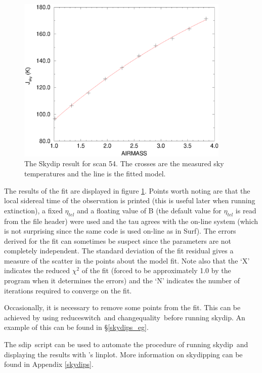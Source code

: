 \documentclass[twoside,11pt]{article}
\newcommand{\scusoft}          {{\sc Surf}}
\newcommand{\Kappa}{\xref{{\sc{Kappa}}}{sun95}{}}
\newcommand{\task}[1]{{\sf #1}}
\newcommand{\chgqual}{\htmlref{\task{change\_quality}}{CHANGE_QUALITY}}
\newcommand{\resw}{\htmlref{\task{reduce\_switch}}{REDUCE_SWITCH}}
\newcommand{\skydip}{\htmlref{\task{skydip}}{SKYDIP}}
\newcommand{\ext}{\htmlref{\task{extinction}}{EXTINCTION}}
\newcommand{\sdip}{\htmlref{\task{sdip}}{SDIP}}
\newcommand{\linplot}{\xref{\task{linplot}}{sun95}{LINPLOT}}
\newcommand{\htmlref}[2]{#1}
\newcommand{\xref}[3]{#1}
\renewcommand{\_}{\texttt{\symbol{95}}}
\begin{document}
\begin{figure}
\begin{center}
\includegraphics[width=4in]{sun216_skydip.eps}
\caption{The Skydip result for scan 54. The crosses are the measured
sky temperatures and the line is the fitted model.}
\label{skyfig}
\end{center}
\end{figure}


The results of the fit are displayed in figure \ref{skyfig}. Points worth
noting are that the local sidereal time of the observation is printed (this is
useful later when running \ext), a fixed $\eta_{tel}$ and a floating value of
B (the default value for $\eta_{tel}$ is read from the file header) were used
and the tau agrees with the on-line system (which is not surprising since the
same code is used on-line as in \scusoft). The errors derived for the fit can
sometimes be suspect since the parameters are not completely independent.  The
standard deviation of the fit residual gives a measure of the scatter in the
points about the model fit.  Note also that the `X' indicates the reduced
$\chi^2$ of the fit (forced to be approximately 1.0 by the program when it
determines the errors) and the `N' indicates the number of iterations required
to converge on the fit.

Occasionally, it is necessary to remove some points from the fit. This
can be achieved by using \resw\ and \chgqual\ before running \skydip.
An example of this can be found in \S\ref{skydips_eg}.


The \sdip\ script can be used to automate the procedure of running
\skydip\ and displaying the results with \Kappa's \linplot. More 
information on skydipping can be found in Appendix \ref{skydips}.
\end{document}
